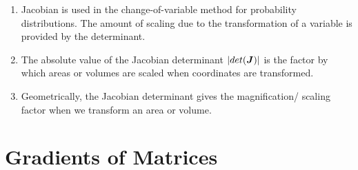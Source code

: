\begin{enumerate}
\begin{enumerate}
        \item Jacobian is used in the change-of-variable method for probability distributions. 
        The amount of scaling due to the transformation of a variable is provided by the determinant.
        \hfill \cite{mfml/book/mml/Deisenroth-Faisal-Ong}

        \item The absolute value of the Jacobian determinant $\left| det(\bm{J}) \right|$ is the factor by which areas or volumes are scaled when coordinates are transformed.
        \hfill \cite{mfml/book/mml/Deisenroth-Faisal-Ong}

        \item Geometrically, the Jacobian determinant gives the magnification/ scaling factor when we transform an area or volume.
        \hfill \cite{mfml/book/mml/Deisenroth-Faisal-Ong}
    \end{enumerate}

\end{enumerate}




\section{Gradients of Matrices}


